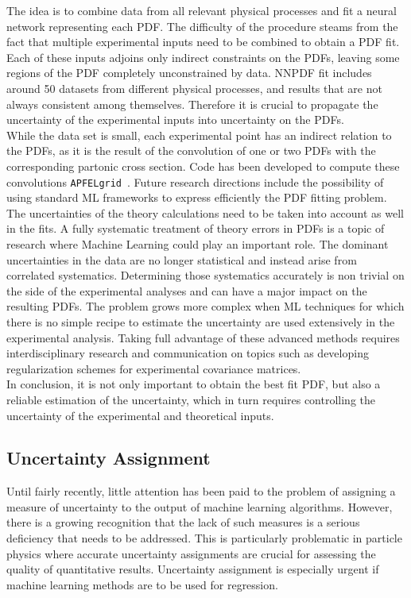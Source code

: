 The idea is to combine data from all relevant physical processes and fit a neural network representing each PDF. The difficulty of the procedure steams from the fact that multiple experimental inputs need to be combined to obtain
a PDF fit. Each of these inputs adjoins only indirect constraints on the PDFs, leaving some regions of the PDF
completely unconstrained by data. NNPDF fit includes around 50 datasets from different physical processes, and results that are not always consistent among themselves. Therefore it is crucial to propagate the uncertainty of the experimental inputs into uncertainty on the PDFs.\\

While the data set is small, each experimental point has an indirect relation to the PDFs, as it is the result of the convolution of one or two PDFs with the corresponding partonic cross section. Code has been developed to compute these convolutions \texttt{APFELgrid}~\cite{Bertone:2016lga}. Future research directions include the possibility of using standard ML frameworks to express efficiently the PDF fitting problem.
The uncertainties of the theory calculations need to be taken into account as well in the fits. A fully systematic treatment of theory errors in PDFs is a topic of research where Machine Learning could play an important role.  The dominant uncertainties in the data are no longer statistical and instead arise from correlated systematics. Determining those systematics accurately is non trivial on the side of the experimental analyses and can have a major impact on the
resulting PDFs. The problem grows more complex when ML techniques for which there is no simple recipe to estimate the uncertainty are used extensively in the experimental analysis. Taking full advantage of these advanced methods requires interdisciplinary research and communication on topics such as developing regularization schemes for experimental covariance matrices.\\

In conclusion, it is not only important to obtain the best fit PDF, but also a reliable estimation of the uncertainty, which in turn requires controlling the uncertainty of the experimental and theoretical inputs.

\subsection{Uncertainty Assignment}\label{sec:uncertainty}
Until fairly recently, little attention has been paid to the problem of assigning a measure of uncertainty to the output of machine learning algorithms. However, there is a growing recognition that the lack of such measures is a serious deficiency that needs to be addressed. This is particularly problematic in particle physics where accurate uncertainty assignments are crucial for assessing the quality of quantitative results. Uncertainty assignment is especially  urgent if machine learning methods are to be used for regression.\\

